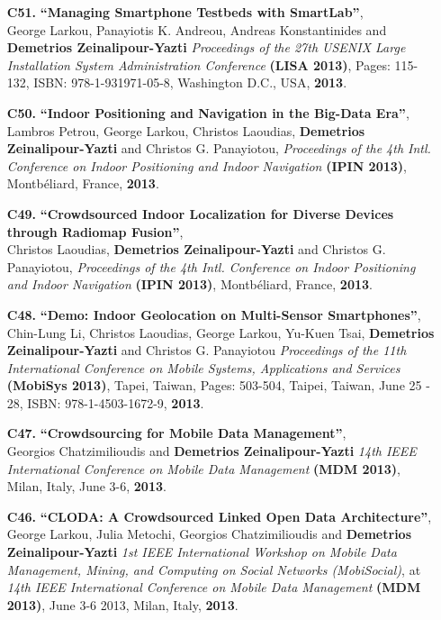 \documentclass[10pt]{article}
\begin{document}
\begin{enumerate}
\item[{\bf C51.}]
\label{C51}
{\bf ``Managing Smartphone Testbeds with SmartLab''}, \\
George Larkou, Panayiotis K. Andreou, Andreas Konstantinides and {\bf Demetrios Zeinalipour-Yazti}
{\em Proceedings of the 27th USENIX Large Installation System Administration Conference}
{\bf (LISA 2013)}, Pages: 115-132, ISBN: 978-1-931971-05-8, Washington D.C., USA, {\bf 2013}.

\item[{\bf C50.}]
\label{C50}
{\bf ``Indoor Positioning and Navigation in the Big-Data Era''}, \\
Lambros Petrou, George Larkou, Christos Laoudias, {\bf Demetrios Zeinalipour-Yazti} and Christos G. Panayiotou,
{\em Proceedings of the 4th Intl. Conference on Indoor Positioning and Indoor Navigation}
{\bf (IPIN 2013)},  Montbéliard, France, {\bf 2013}.
 
\item[{\bf C49.}]
\label{C49}
{\bf ``Crowdsourced Indoor Localization for Diverse Devices through Radiomap Fusion''}, \\
Christos Laoudias, {\bf Demetrios Zeinalipour-Yazti} and Christos G. Panayiotou,
{\em Proceedings of the 4th Intl. Conference on Indoor Positioning and Indoor Navigation}
{\bf (IPIN 2013)},  Montbéliard, France, {\bf 2013}.

\item[{\bf C48.}]
\label{C48}
{\bf ``Demo: Indoor Geolocation on Multi-Sensor Smartphones''}, \\
Chin-Lung Li, Christos Laoudias, George Larkou, Yu-Kuen Tsai, {\bf Demetrios Zeinalipour-Yazti} and Christos G. Panayiotou
{\em Proceedings of the 11th International Conference on Mobile Systems, Applications and Services}
{\bf (MobiSys 2013)}, Tapei, Taiwan, Pages: 503-504, Taipei, Taiwan, June 25 - 28, ISBN: 978-1-4503-1672-9, {\bf 2013}.

\item[{\bf C47.}]
\label{C47}
{\bf ``Crowdsourcing for Mobile Data Management''}, \\
Georgios Chatzimilioudis and {\bf Demetrios Zeinalipour-Yazti}
{\em 14th IEEE International Conference on Mobile Data Management} {\bf (MDM 2013)}, Milan, Italy, June 3-6, {\bf 2013}.

\item[{\bf C46.}]
\label{C46}
{\bf ``CLODA: A Crowdsourced Linked Open Data Architecture''}, \\
George Larkou, Julia Metochi, Georgios Chatzimilioudis and {\bf Demetrios Zeinalipour-Yazti}
{\em 1st IEEE International Workshop on Mobile Data Management, Mining, and Computing on Social Networks (MobiSocial)}, at {\em 14th IEEE International Conference on Mobile Data Management} {\bf (MDM 2013)}, June 3-6 2013, Milan, Italy, {\bf 2013}.
 

\end{enumerate}
\end{document}
